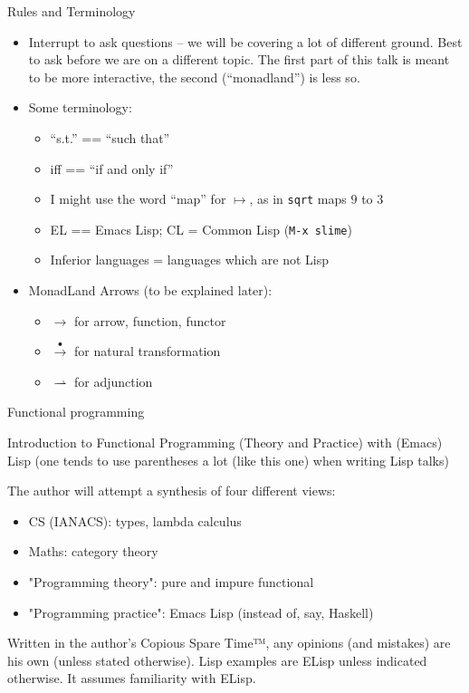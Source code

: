 \documentclass[presentation]{beamer}
\newcommand\nat[2]{{#1}\overset{\bullet}{\rightarrow}{#2}}
\begin{document}
\begin{frame}{Rules and Terminology}
  \begin{itemize}
  \item Interrupt to ask questions -- we will be covering a lot of different ground.  Best to ask before we are on a different topic.  The first part of this talk is meant to be more interactive, the second (``monadland'') is less so.
  \item Some terminology:
    \begin{itemize}
    \item ``s.t.'' == ``such that''
    \item iff == ``if and only if''
    \item I might use the word ``map'' for $\mapsto$, as in \texttt{sqrt} maps $9$ to $3$
    \item EL == Emacs Lisp; CL = Common Lisp (\texttt{M-x slime})
    \item Inferior languages = languages which are not Lisp
    \end{itemize}
  \item MonadLand Arrows (to be explained later):
    \begin{itemize}
    \item $\rightarrow$ for arrow, function, functor 
    \item $\nat{}{}$ for natural transformation
    \item $\rightharpoonup$ for adjunction
    \end{itemize}
  \end{itemize}
\end{frame}

\begin{frame}{Functional programming}
\label{sec:org033efd0}

Introduction to Functional Programming (Theory and Practice) with (Emacs) Lisp (one tends to use parentheses a lot (like this one) when writing Lisp talks)

\smallskip
The author will attempt a synthesis of four different views:

\begin{itemize}
\item CS (IANACS): types, lambda calculus
\item Maths: category theory
\item "Programming theory": pure and impure functional
\item "Programming practice": Emacs Lisp (instead of, say, Haskell)
\end{itemize}

Written in the author's Copious Spare Time™, any opinions (and mistakes) are his own (unless stated otherwise).  Lisp examples are ELisp unless indicated otherwise.  It assumes familiarity with ELisp.

\end{frame}
\end{document}
